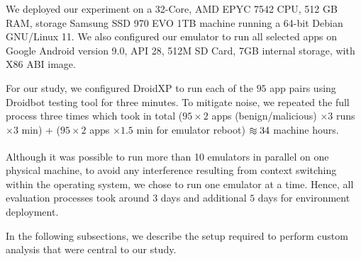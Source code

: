 We deployed our experiment on a 32-Core, AMD EPYC 7542 CPU, 512 GB RAM, storage Samsung SSD 970 EVO 1TB machine running a 64-bit Debian  GNU/Linux 11. We also configured our emulator to run all selected apps on Google Android version 9.0, API 28, 512M SD Card, 7GB internal storage, with X86 ABI image.

For our study, we configured DroidXP to run each of the $95$  app pairs using Droidbot testing tool for three minutes. To mitigate noise, we repeated the full process three times which took in total ($95 \times 2$ apps (benign/malicious) $\times 3$ runs $\times 3$ min) + ($95 \times 2$ apps $\times 1.5$ min for emulator reboot) $\apeq 34$ machine hours.

Although it was possible to run more than 10 emulators in parallel on one physical machine, to avoid any interference resulting from context switching within the operating system, we chose to run one emulator at a time. Hence, all evaluation processes took around $3$ days and additional $5$ days for environment deployment.

In the following subsections, we describe the setup required to perform custom analysis that were central to our study.



